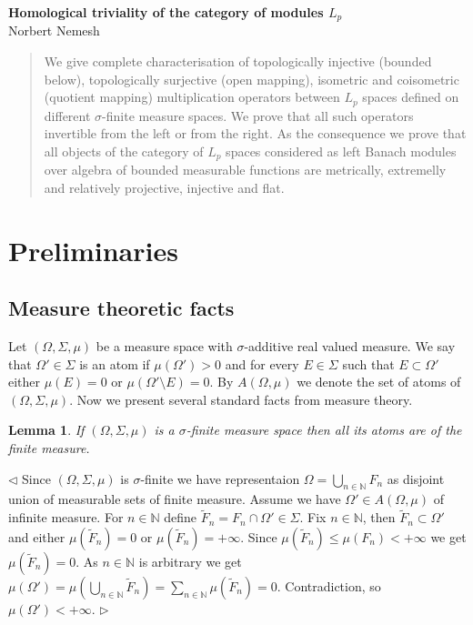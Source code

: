 \documentclass[12pt]{article}
\newtheorem{lemma}[theorem]{Lemma}
\newenvironment{proof}{\par $\triangleleft$}{$\triangleright$}
\begin{document}
\begin{center}

\Large \textbf{Homological triviality of the category of modules $L_p$}\\[0.5cm]
\small {Norbert Nemesh}\\[0.5cm]

\end{center}
\thispagestyle{empty}

\begin{abstract}
We give complete characterisation of topologically injective (bounded below), topologically surjective (open mapping), isometric and coisometric (quotient mapping) multiplication operators between $L_p$ spaces defined on different $\sigma$-finite measure spaces. We prove that all such operators invertible from the left or from the right. As the consequence we prove that all objects of the category of $L_p$ spaces considered as left Banach modules over algebra of bounded measurable functions are metrically, extremelly and relatively projective, injective and flat.
\end{abstract}


\section{Preliminaries}

\subsection{Measure theoretic facts}

Let $(\Omega,\Sigma,\mu)$ be a measure space with $\sigma$-additive real valued measure. We say that $\Omega'\in\Sigma$ is an atom if $\mu(\Omega')>0$ and for every $E\in\Sigma$ such that $E\subset\Omega'$ either $\mu(E)=0$ or $\mu(\Omega'\setminus E)=0$. By $A(\Omega,\mu)$ we denote the set of atoms of $(\Omega,\Sigma,\mu)$. Now we present several standard facts from measure theory.

\begin{lemma}\label{AtomDescInSigmFinMeasSp} If $(\Omega,\Sigma,\mu)$ is a $\sigma$-finite measure space then all its atoms are of the finite measure.
\end{lemma}
\begin{proof} Since $(\Omega,\Sigma,\mu)$ is $\sigma$-finite we have representaion $\Omega=\bigcup_{n\in\mathbb{N}} F_n$ as disjoint union of measurable sets of finite measure. Assume we have $\Omega'\in A(\Omega,\mu)$ of infinite measure. For $n\in\mathbb{N}$ define $\widetilde{F}_n=F_n\cap \Omega'\in\Sigma$. Fix $n\in\mathbb{N}$, then $\widetilde{F}_n\subset\Omega'$ and either $\mu(\widetilde{F}_n)=0$ or $\mu(\widetilde{F}_n)=+\infty$. Since $\mu(\widetilde{F}_n)\leq\mu(F_n)<+\infty$ we get $\mu(\widetilde{F}_n)=0$. As $n\in\mathbb{N}$ is arbitrary we get $\mu(\Omega')=\mu(\bigcup_{n\in\mathbb{N}}\widetilde{F}_n)=\sum_{n\in\mathbb{N}}\mu(\widetilde{F}_n)=0$. Contradiction, so $\mu(\Omega')<+\infty$.
\end{proof}
\end{document}
